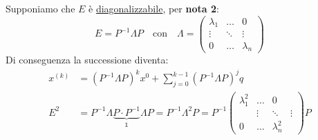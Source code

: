 \documentclass{article}
\begin{document}
Supponiamo che $E$ è \underline{diagonalizzabile}, per \textbf{nota 2}:
\[E=P^{-1}\Lambda P\quad\text{con}\quad\Lambda=\begin{pmatrix}
        \lambda_1 & \dots  & 0         \\
        \vdots    & \ddots & \vdots    \\
        0         & \dots  & \lambda_n
    \end{pmatrix}\]
Di conseguenza la successione diventa:
\begin{align*}
    x^{(k)} & =\left(P^{-1}\Lambda P\right)^kx^0+\sum_{j=0}^{k-1}\left(P^{-1}\Lambda P\right)^jq      \\
    E^2     & =P^{-1}\Lambda \underbrace{P\cdot P^{-1}}_{\mathbb 1}\Lambda P=P^{-1}\Lambda^2 P=P^{-1}
    \begin{pmatrix}
        \lambda^2_1 & \dots  & 0                    \\
                    & \vdots & \ddots      & \vdots \\
        0           & \dots  & \lambda^2_n
    \end{pmatrix}P
\end{align*}
\end{document}
